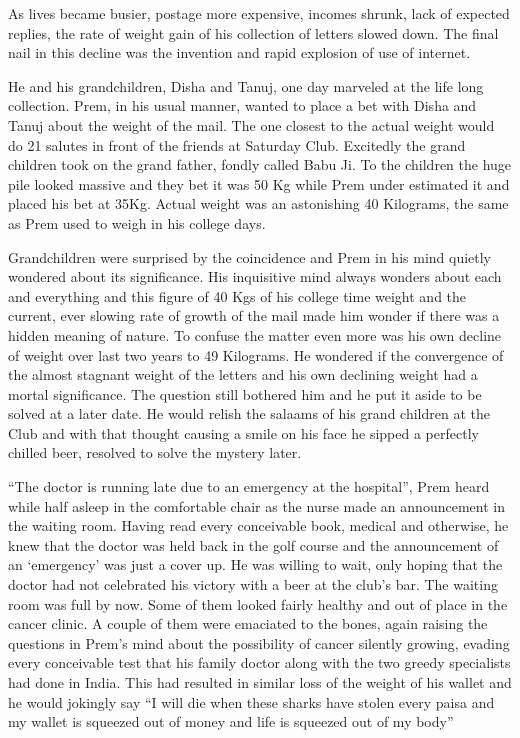 As lives became busier, postage more expensive, incomes shrunk, lack of
expected replies, the rate of weight gain of his collection of letters
slowed down. The final nail in this decline was the invention and rapid
explosion of use of internet.

He and his grandchildren, Disha and Tanuj, one day marveled at the life
long collection. Prem, in his usual manner, wanted to place a bet with
Disha and Tanuj about the weight of the mail. The one closest to the
actual weight would do 21 salutes in front of the friends at Saturday
Club. Excitedly the grand children took on the grand father, fondly
called Babu Ji. To the children the huge pile looked massive and they
bet it was 50 Kg while Prem under estimated it and placed his bet at
35Kg. Actual weight was an astonishing 40 Kilograms, the same as Prem
used to weigh in his college days.

Grandchildren were surprised by the coincidence and Prem in his mind
quietly wondered about its significance. His inquisitive mind always
wonders about each and everything and this figure of 40 Kgs of his
college time weight and the current, ever slowing rate of growth of the
mail made him wonder if there was a hidden meaning of nature. To confuse
the matter even more was his own decline of weight over last two years
to 49 Kilograms. He wondered if the convergence of the almost stagnant
weight of the letters and his own declining weight had a mortal
significance. The question still bothered him and he put it aside to be
solved at a later date. He would relish the salaams of his grand
children at the Club and with that thought causing a smile on his face
he sipped a perfectly chilled beer, resolved to solve the mystery later.

``The doctor is running late due to an emergency at the hospital'', Prem
heard while half asleep in the comfortable chair as the nurse made an
announcement in the waiting room. Having read every conceivable book,
medical and otherwise, he knew that the doctor was held back in the golf
course and the announcement of an `emergency' was just a cover up. He
was willing to wait, only hoping that the doctor had not celebrated his
victory with a beer at the club's bar. The waiting room was full by now.
Some of them looked fairly healthy and out of place in the cancer
clinic. A couple of them were emaciated to the bones, again raising the
questions in Prem's mind about the possibility of cancer silently
growing, evading every conceivable test that his family doctor along
with the two greedy specialists had done in India. This had resulted in
similar loss of the weight of his wallet and he would jokingly say ``I
will die when these sharks have stolen every paisa and my wallet is
squeezed out of money and life is squeezed out of my body''

